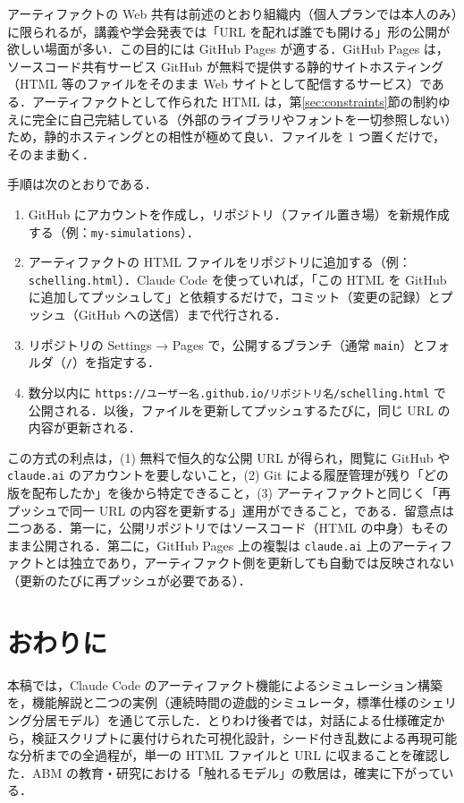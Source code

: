 \documentclass[a4paper]{jlreq}
\begin{document}
アーティファクトの Web 共有は前述のとおり組織内（個人プランでは本人のみ）に限られるが，講義や学会発表では「URL を配れば誰でも開ける」形の公開が欲しい場面が多い．この目的には GitHub Pages が適する．GitHub Pages は，ソースコード共有サービス GitHub が無料で提供する静的サイトホスティング（HTML 等のファイルをそのまま Web サイトとして配信するサービス）である\cite{github-pages}．アーティファクトとして作られた HTML は，第\ref{sec:constraints}節の制約ゆえに完全に自己完結している（外部のライブラリやフォントを一切参照しない）ため，静的ホスティングとの相性が極めて良い．ファイルを 1 つ置くだけで，そのまま動く．

手順は次のとおりである．

\begin{enumerate}
  \item GitHub にアカウントを作成し，リポジトリ（ファイル置き場）を新規作成する（例：\texttt{my-simulations}）．
  \item アーティファクトの HTML ファイルをリポジトリに追加する（例：\texttt{schelling.html}）．Claude Code を使っていれば，「この HTML を GitHub に追加してプッシュして」と依頼するだけで，コミット（変更の記録）とプッシュ（GitHub への送信）まで代行される．
  \item リポジトリの Settings → Pages で，公開するブランチ（通常 \texttt{main}）とフォルダ（\texttt{/}）を指定する．
  \item 数分以内に \texttt{https://ユーザー名.github.io/リポジトリ名/schelling.html} で公開される．以後，ファイルを更新してプッシュするたびに，同じ URL の内容が更新される．
\end{enumerate}

この方式の利点は，(1) 無料で恒久的な公開 URL が得られ，閲覧に GitHub や \texttt{claude.ai} のアカウントを要しないこと，(2) Git による履歴管理が残り「どの版を配布したか」を後から特定できること，(3) アーティファクトと同じく「再プッシュで同一 URL の内容を更新する」運用ができること，である．留意点は二つある．第一に，公開リポジトリではソースコード（HTML の中身）もそのまま公開される．第二に，GitHub Pages 上の複製は \texttt{claude.ai} 上のアーティファクトとは独立であり，アーティファクト側を更新しても自動では反映されない（更新のたびに再プッシュが必要である）．

\section{おわりに}

本稿では，Claude Code のアーティファクト機能によるシミュレーション構築を，機能解説と二つの実例（連続時間の遊戯的シミュレータ，標準仕様のシェリング分居モデル）を通じて示した．とりわけ後者では，対話による仕様確定から，検証スクリプトに裏付けられた可視化設計，シード付き乱数による再現可能な分析までの全過程が，単一の HTML ファイルと URL に収まることを確認した．ABM の教育・研究における「触れるモデル」の敷居は，確実に下がっている．
\end{document}
